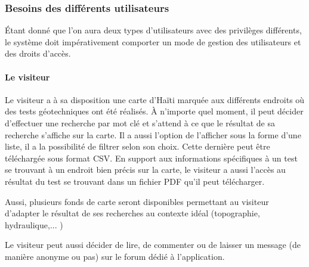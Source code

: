         \subsubsection{Besoins des différents utilisateurs}
        Étant donné que l'on aura deux types d'utilisateurs avec des privilèges différents,
        le système doit impérativement comporter un mode de gestion des utilisateurs et des droits d'accès.
        \paragraph{Le visiteur}
        Le visiteur a à sa disposition une carte d'Haïti marquée aux différents endroits où des tests 
        géotechniques ont été réalisés.
        À n'importe quel moment, il peut décider d'effectuer une recherche par mot clé et s'attend
        à ce que le résultat de sa recherche s'affiche sur la carte. Il a aussi l'option de l'afficher sous la forme
        d'une liste, il a la possibilité de filtrer selon son choix. Cette dernière peut être téléchargée sous format CSV.
        En support aux informations spécifiques à un test se trouvant à un endroit bien précis sur la carte,
        le visiteur a aussi l'accès au résultat du test se trouvant dans un fichier PDF qu'il peut télécharger.
        \par
        Aussi, plusieurs fonds de carte seront disponibles permettant au visiteur d'adapter le résultat de ses recherches
        au contexte idéal (topographie, hydraulique,... )
        \par
        Le visiteur peut aussi décider de lire, de commenter ou de laisser un message (de manière anonyme ou pas) sur le forum dédié à l'application.
